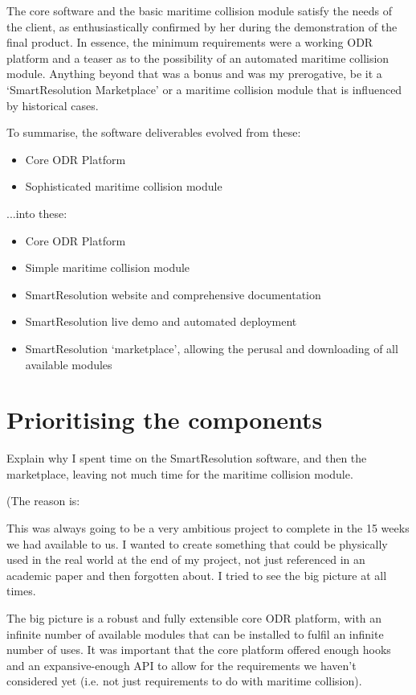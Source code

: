 The core software and the basic maritime collision module satisfy the needs of the client, as enthusiastically confirmed by her during the demonstration of the final product. In essence, the minimum requirements were a working ODR platform and a teaser as to the possibility of an automated maritime collision module. Anything beyond that was a bonus and was my prerogative, be it a `SmartResolution Marketplace' or a maritime collision module that is influenced by historical cases.

To summarise, the software deliverables evolved from these:

\begin{itemize}
\item Core ODR Platform
\item Sophisticated maritime collision module
\end{itemize}

...into these:

\begin{itemize}
\item Core ODR Platform
\item Simple maritime collision module
\item SmartResolution website and comprehensive documentation
\item SmartResolution live demo and automated deployment
\item SmartResolution `marketplace', allowing the perusal and downloading of all available modules
\end{itemize}

\section{Prioritising the components}

Explain why I spent time on the SmartResolution software, and then the marketplace, leaving not much time for the maritime collision module.

(The reason is:

This was always going to be a very ambitious project to complete in the 15 weeks we had available to us. I wanted to create something that could be physically used in the real world at the end of my project, not just referenced in an academic paper and then forgotten about. I tried to see the big picture at all times.

The big picture is a robust and fully extensible core ODR platform, with an infinite number of available modules that can be installed to fulfil an infinite number of uses. It was important that the core platform offered enough hooks and an expansive-enough API to allow for the requirements we haven't considered yet (i.e. not just requirements to do with maritime collision).


